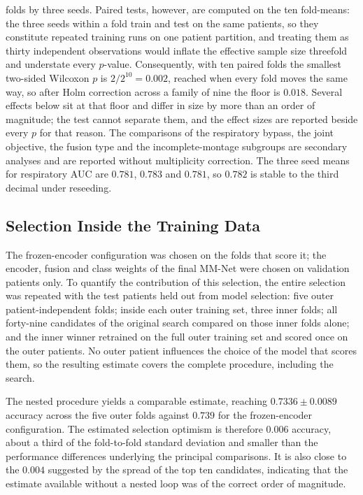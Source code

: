 \documentclass[a4paper,fleqn]{cas-sc}
\newcommand{\fzAcc}{0.739}
\newcommand{\fzAuc}{0.782}
\begin{document}
folds by three seeds. Paired tests, however, are computed on the ten fold-means: the three seeds within a fold train and test on the same patients, so they constitute repeated training runs on one patient partition, and treating them as thirty independent observations would inflate the effective sample size threefold and understate every $p$-value. Consequently, with ten paired folds the smallest two-sided Wilcoxon $p$ is $2/2^{10}=0.002$, reached when every fold moves the same way, so after Holm correction across a family of nine the floor is $0.018$. Several effects below sit at that floor and differ in size by more than an order of
magnitude; the test cannot separate them, and the effect sizes are reported beside every
$p$ for that reason. The comparisons of the respiratory bypass, the joint objective, the fusion
type and the incomplete-montage subgroups are secondary analyses and are reported without
multiplicity correction. The three seed means for respiratory AUC are
$0.781$, $0.783$ and $0.781$, so $\fzAuc$ is stable to the third decimal under reseeding.

\subsection{Selection Inside the Training Data}
\label{sec:nested}
The frozen-encoder configuration was chosen on the folds that score it; the encoder, fusion and
class weights of the final MM-Net were chosen on validation patients only. To quantify the contribution of this selection, the entire selection was repeated with the test patients held out from model selection: five outer patient-independent folds; inside each outer training set, three inner folds; all forty-nine candidates of the original search compared on those inner folds alone; and the inner winner retrained on the full outer training set and scored once on the outer patients.
No outer patient influences the choice of the model that scores them, so the resulting estimate covers the complete procedure, including the search.

The nested procedure yields a comparable estimate, reaching $0.7336 \pm 0.0089$ accuracy across the five outer folds against $\fzAcc$ for the frozen-encoder configuration. The estimated selection optimism is therefore $0.006$ accuracy, about a third of the
fold-to-fold standard
deviation and smaller than the performance differences underlying the principal comparisons.
It is also close to the $0.004$ suggested by the spread of the top ten candidates, indicating that the estimate available without a nested loop was of the correct order of magnitude.
\end{document}

